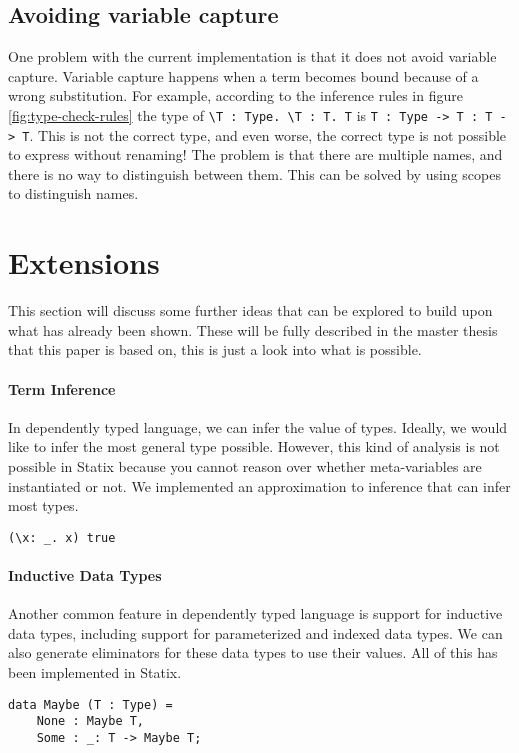 \documentclass[a4paper,UKenglish,cleveref, autoref, thm-restate]{oasics-v2021}
\begin{document}
\subsection{Avoiding variable capture}
One problem with the current implementation is that it does not avoid variable capture. Variable capture happens when a term becomes bound because of a wrong substitution. For example, according to the inference rules in figure \ref{fig:type-check-rules} the type of \verb|\T : Type. \T : T. T| is \verb|T : Type -> T : T -> T|. This is not the correct type, and even worse, the correct type is not possible to express without renaming! The problem is that there are multiple names, and there is no way to distinguish between them. This can be solved by using scopes to distinguish names. 

\section{Extensions}
This section will discuss some further ideas that can be explored to build upon what has already been shown. These will be fully described in the master thesis that this paper is based on, this is just a look into what is possible.

\paragraph*{Term Inference}
In dependently typed language, we can infer the value of types. Ideally, we would like to infer the most general type possible. However, this kind of analysis is not possible in Statix because you cannot reason over whether meta-variables are instantiated or not. We implemented an approximation to inference that can infer most types.
\begin{lstlisting}
(\x: _. x) true
\end{lstlisting}

\paragraph*{Inductive Data Types}
Another common feature in dependently typed language is support for inductive data types, including support for parameterized and indexed data types. We can also generate eliminators for these data types to use their values. All of this has been implemented in Statix. 
\begin{lstlisting}
data Maybe (T : Type) = 
    None : Maybe T,
    Some : _: T -> Maybe T;
\end{lstlisting}
\end{document}
